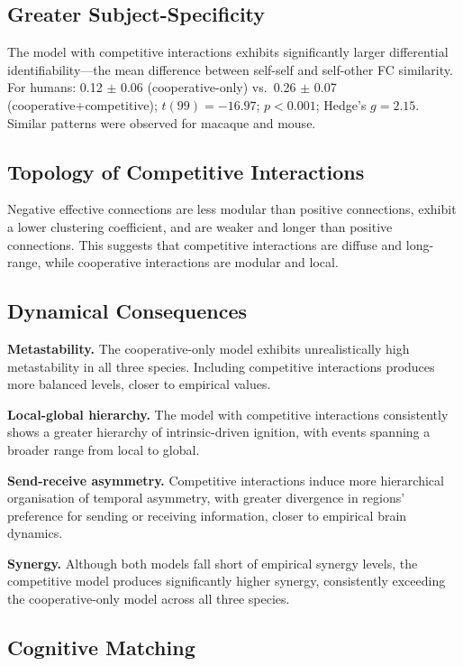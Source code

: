 \documentclass{article}
\begin{document}
\subsection{Greater Subject-Specificity}

The model with competitive interactions exhibits significantly larger differential identifiability---the mean difference between self-self and self-other FC similarity. For humans: 0.12 $\pm$ 0.06 (cooperative-only) vs.\ 0.26 $\pm$ 0.07 (cooperative+competitive); $t(99) = -16.97$; $p < 0.001$; Hedge's $g = 2.15$. Similar patterns were observed for macaque and mouse.

\subsection{Topology of Competitive Interactions}

Negative effective connections are less modular than positive connections, exhibit a lower clustering coefficient, and are weaker and longer than positive connections. This suggests that competitive interactions are diffuse and long-range, while cooperative interactions are modular and local.

\subsection{Dynamical Consequences}

\textbf{Metastability.} The cooperative-only model exhibits unrealistically high metastability in all three species. Including competitive interactions produces more balanced levels, closer to empirical values.

\textbf{Local-global hierarchy.} The model with competitive interactions consistently shows a greater hierarchy of intrinsic-driven ignition, with events spanning a broader range from local to global.

\textbf{Send-receive asymmetry.} Competitive interactions induce more hierarchical organisation of temporal asymmetry, with greater divergence in regions' preference for sending or receiving information, closer to empirical brain dynamics.

\textbf{Synergy.} Although both models fall short of empirical synergy levels, the competitive model produces significantly higher synergy, consistently exceeding the cooperative-only model across all three species.

\subsection{Cognitive Matching}
\end{document}
